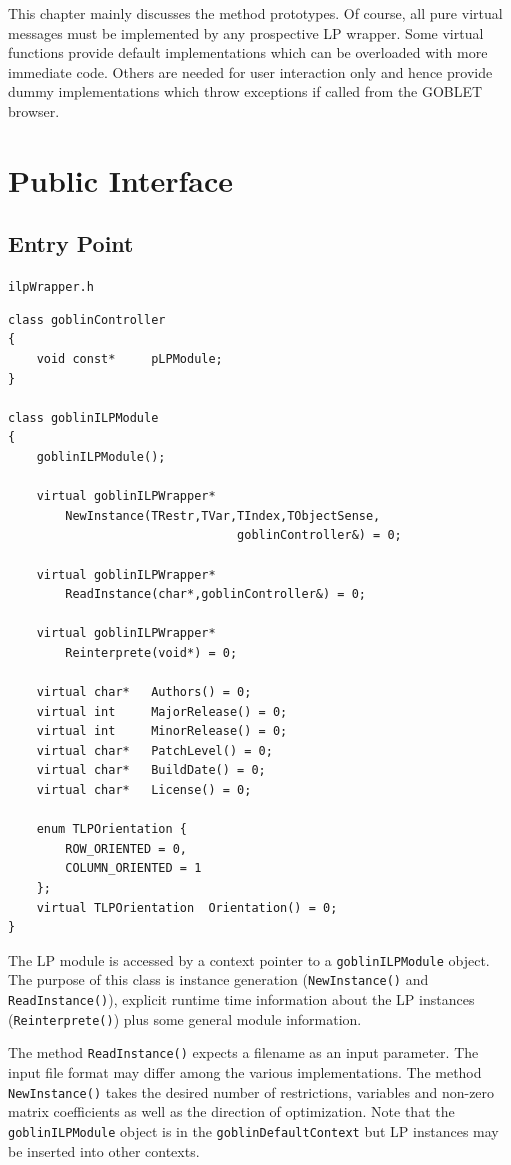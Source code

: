 \documentclass[a4paper,11pt,twoside]{book}
\begin{document}
\begin{multicols}{2}
This chapter mainly discusses the method prototypes. Of course, all pure virtual
messages must be implemented by any prospective LP wrapper. Some virtual
functions provide default implementations which can be overloaded with more
immediate code. Others are needed for user interaction only and hence
provide dummy implementations which throw exceptions if called from the GOBLET
browser.


\newpage
{}
\section{Public Interface}

\subsection{Entry Point}
\myinclude\verb/ilpWrapper.h/
\begin{mymethods}
\begin{verbatim}
class goblinController
{
    void const*     pLPModule;
}

class goblinILPModule
{
    goblinILPModule();

    virtual goblinILPWrapper*
        NewInstance(TRestr,TVar,TIndex,TObjectSense,
                                goblinController&) = 0;

    virtual goblinILPWrapper*
        ReadInstance(char*,goblinController&) = 0;

    virtual goblinILPWrapper*
        Reinterprete(void*) = 0;

    virtual char*   Authors() = 0;
    virtual int     MajorRelease() = 0;
    virtual int     MinorRelease() = 0;
    virtual char*   PatchLevel() = 0;
    virtual char*   BuildDate() = 0;
    virtual char*   License() = 0;

    enum TLPOrientation {
        ROW_ORIENTED = 0,
        COLUMN_ORIENTED = 1
    };
    virtual TLPOrientation  Orientation() = 0;
}
\end{verbatim}
\end{mymethods}
The LP module is accessed by a context pointer to a \verb/goblinILPModule/
object. The purpose of this class is instance generation (\verb/NewInstance()/
and \verb/ReadInstance()/), explicit runtime time information about the
LP instances (\verb/Reinterprete()/) plus some general module information.

The method \verb/ReadInstance()/ expects a filename as an input parameter.
The input file format may differ among the various implementations. The
method \verb/NewInstance()/ takes the desired number of restrictions, variables
and non-zero matrix coefficients as well as the direction of optimization.
Note that the \verb/goblinILPModule/ object is in the
\verb/goblinDefaultContext/ but LP instances may be inserted into other
contexts.


\end{multicols}
\end{document}
